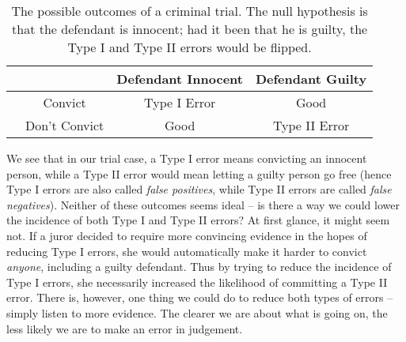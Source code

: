 \begin{table*}[h!]

	\centering

		\begin{tabular}{|c||c|c|}

			\hline

				\textbf{ } & \textbf{Defendant Innocent} & \textbf{Defendant Guilty}\\

				\hline \hline

\ \ Convict & Type I Error & Good\\

\hline

\ \ Don't Convict & Good & Type II Error\\

\hline

				\end{tabular}

	\caption{The possible outcomes of a criminal trial.  The null hypothesis is that the defendant is innocent; had it been that he is guilty, the Type I and Type II errors would be flipped.}

	\label{Jury Outcomes}

\end{table*}



We see that in our trial case, a Type I error means convicting an innocent person, while a Type II error would mean letting a guilty person go free (hence Type I errors are also called \emph{false positives}, while Type II errors are called \emph{false negatives}).  Neither of these outcomes seems ideal -- is there a way we could lower the incidence of both Type I and Type II errors?  At first glance, it might seem not.  If a juror decided to require more convincing evidence in the hopes of reducing Type I errors, she would automatically make it harder to convict \emph{anyone}, including a guilty defendant.  Thus by trying to reduce the incidence of Type I errors, she necessarily increased the likelihood of committing a Type II error.  There is, however, one thing we could do to reduce both types of errors -- simply listen to more evidence.  The clearer we are about what is going on, the less likely we are to make an error in judgement.



\ \\



